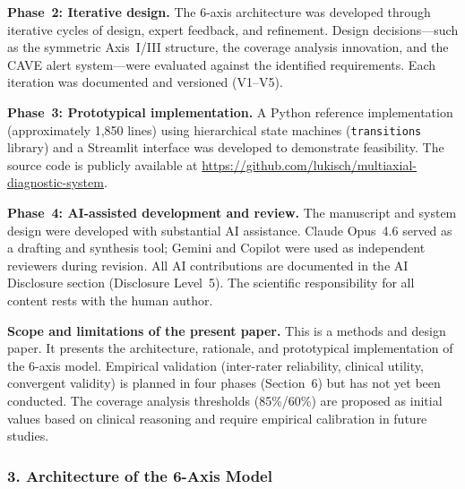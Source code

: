 \documentclass[11pt,a4paper]{article}
\begin{document}
\textbf{Phase~2: Iterative design.} The 6-axis architecture was developed through iterative cycles of design, expert feedback, and refinement. Design decisions---such as the symmetric Axis~I/III structure, the coverage analysis innovation, and the CAVE alert system---were evaluated against the identified requirements. Each iteration was documented and versioned (V1--V5).

\textbf{Phase~3: Prototypical implementation.} A Python reference implementation (approximately 1,850 lines) using hierarchical state machines (\texttt{transitions} library) and a Streamlit interface was developed to demonstrate feasibility. The source code is publicly available at \url{https://github.com/lukisch/multiaxial-diagnostic-system}.

\textbf{Phase~4: AI-assisted development and review.} The manuscript and system design were developed with substantial AI assistance. Claude Opus~4.6 served as a drafting and synthesis tool; Gemini and Copilot were used as independent reviewers during revision. All AI contributions are documented in the AI Disclosure section (Disclosure Level~5). The scientific responsibility for all content rests with the human author.

\textbf{Scope and limitations of the present paper.} This is a methods and design paper. It presents the architecture, rationale, and prototypical implementation of the 6-axis model. Empirical validation (inter-rater reliability, clinical utility, convergent validity) is planned in four phases (Section~6) but has not yet been conducted. The coverage analysis thresholds (85\%/60\%) are proposed as initial values based on clinical reasoning and require empirical calibration in future studies.

\subsubsection*{3. Architecture of the 6-Axis Model}
\end{document}
